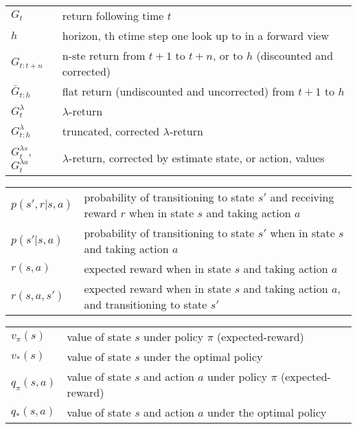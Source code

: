 \documentclass[8pt, landscape]{article}
\begin{document}
\begin{multicols}{3}
        \begin{tabular}{ p{} p{} }
            $G_t$                                    & return following time $t$                                              \\
            $h$                                      & horizon, th etime step one look up to in a forward view                \\
            $G_{t:t+n}$                              & n-ste return from $t+1$ to $t+n$, or to $h$ (discounted and corrected) \\
            $\bar{G}_{t:h}$                          & flat return (undiscounted and uncorrected) from $t+1$ to $h$           \\
            $G_{t}^{\lambda}$                        & $\lambda$-return                                                       \\
            $G_{t:h}^{\lambda}$                      & truncated, corrected $\lambda$-return                                  \\
            $G_{t}^{\lambda s}$, $G_{t}^{\lambda a}$ & $\lambda$-return, corrected by estimate state, or action, values       \\
        \end{tabular}

        \begin{tabular}{ p{} p{} }
            $p(s',r|s,a)$ & probability of transitioning to state $s'$ and receiving reward $r$ when in state $s$ and taking action $a$ \\
            $p(s'|s,a)$   & probability of transitioning to state $s'$ when in state $s$ and taking action $a$                          \\
            $r(s,a)$      & expected reward when in state $s$ and taking action $a$                                                     \\
            $r(s,a,s')$   & expected reward when in state $s$ and taking action $a$, and transitioning to state $s'$                    \\
        \end{tabular}

        \begin{tabular}{ p{} p{} }
            $v_{\pi}(s)$   & value of state $s$ under policy $\pi$ (expected-reward)                \\
            $v_{*}(s)$     & value of state $s$ under the optimal policy                            \\
            $q_{\pi}(s,a)$ & value of state $s$ and action $a$ under policy $\pi$ (expected-reward) \\
            $q_{*}(s,a)$   & value of state $s$ and action $a$ under the optimal policy             \\
        \end{tabular}


\end{multicols}
\end{document}
